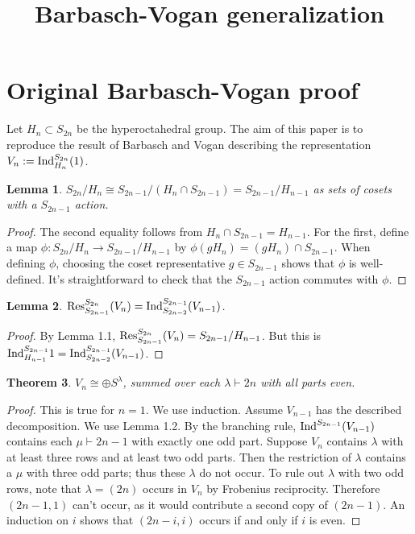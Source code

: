 \documentclass[12pt]{amsart}
\title{Barbasch-Vogan generalization}
\theoremstyle{plain}
\newtheorem{theorem}{Theorem}[section]
\newtheorem{lemma}[theorem]{Lemma}
\theoremstyle{definition}
\theoremstyle{remark}
\newcommand{\Ind}{\textup{Ind}}
\newcommand{\Res}{\textup{Res}}
\begin{document}
\maketitle
\section{Original Barbasch-Vogan proof}
Let $H_n \subset S_{2n}$ be the hyperoctahedral group. The aim of this paper is to reproduce the result of Barbasch and Vogan describing the representation $V_n := \Ind_{H_n}^{S_{2n}}(1)$.
\begin{lemma}
$S_{2n}/H_n \cong S_{2n-1}/(H_n \cap S_{2n-1}) = S_{2n-1}/H_{n-1}$ as sets of cosets with a $S_{2n-1}$ action. 
\end{lemma}
\begin{proof}
The second equality follows from $H_n \cap S_{2n-1} = H_{n-1}$. For the first, define a map $\phi: S_{2n} / H_n \to S_{2n-1}/H_{n-1}$ by $\phi(gH_n) = (gH_n) \cap S_{2n-1}$. When defining $\phi$, choosing the coset representative $g \in S_{2n-1}$ shows that $\phi$ is well-defined. It's straightforward to check that the $S_{2n-1}$ action commutes with $\phi$.
\end{proof}

\begin{lemma}
$\Res_{S_{2n-1}}^{S_{2n}}(V_n) = \Ind_{S_{2n-2}}^{S_{2n-1}}(V_{n-1})$.
\end{lemma}
\begin{proof}
By Lemma 1.1, $\Res_{S_{2n-1}}^{S_{2n}}(V_n) = S_{2n-1}/H_{n-1}$. But this is
\newline $ \Ind_{H_{n-1}}^{S_{2n-1}} 1 = \Ind_{S_{2n-2}}^{S_{2n-1}}(V_{n-1})$.
\end{proof}

\begin{theorem}
$V_n \cong \oplus S^\lambda$, summed over each $\lambda \vdash 2n$ with all parts even.
\end{theorem}
\begin{proof}
This is true for $n=1$. We use induction. Assume $V_{n-1}$ has the described decomposition. We use Lemma 1.2. By the branching rule, $\Ind^{S_{2n-1}}(V_{n-1})$ contains each $\mu \vdash 2n-1$ with exactly one odd part. Suppose $V_n$ contains $\lambda$ with at least three rows and at least two odd parts. Then the restriction of $\lambda$ contains a $\mu$ with three odd parts; thus these $\lambda$ do not occur. To rule out $\lambda$ with two odd rows, note that $\lambda=(2n)$ occurs in $V_n$ by Frobenius reciprocity. Therefore $(2n-1,1)$ can't occur, as it would contribute a second copy of $(2n-1)$. An induction on $i$ shows that $(2n-i,i)$ occurs if and only if $i$ is even.
\end{proof}
\end{document}
